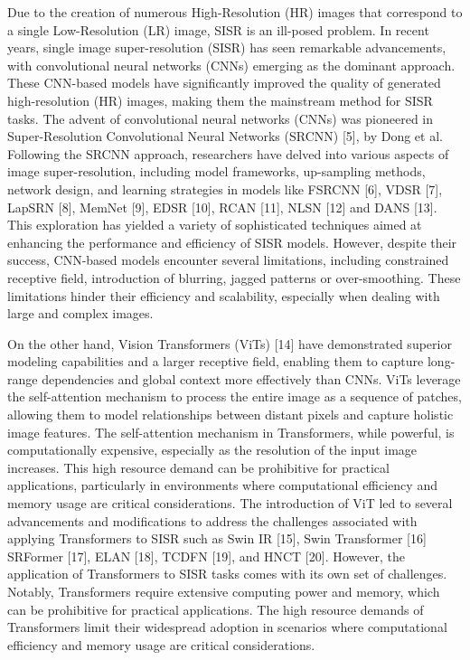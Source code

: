 \documentclass{ieeeaccess}
\begin{document}
Due to the creation of numerous High-Resolution (HR) images that correspond to a single Low-Resolution (LR) image, SISR is an ill-posed problem. In recent years, single image super-resolution (SISR) has seen remarkable advancements, with convolutional neural networks (CNNs) emerging as the dominant approach. These CNN-based models have significantly improved the quality of generated high-resolution (HR) images, making them the mainstream method for SISR tasks. The advent of convolutional neural networks (CNNs) was pioneered in Super-Resolution Convolutional Neural Networks (SRCNN) [5],  by Dong et al. Following the SRCNN approach, researchers have delved into various aspects of image super-resolution, including model frameworks, up-sampling methods, network design, and learning strategies in models like FSRCNN [6], VDSR [7], LapSRN [8], MemNet [9], EDSR [10], RCAN [11], NLSN [12] and DANS [13]. This exploration has yielded a variety of sophisticated techniques aimed at enhancing the performance and efficiency of SISR models. However, despite their success, CNN-based models encounter several limitations, including constrained receptive field, introduction of blurring, jagged patterns or over-smoothing. These limitations hinder their efficiency and scalability, especially when dealing with large and complex images.

On the other hand, Vision Transformers (ViTs) [14] have demonstrated superior modeling capabilities and a larger receptive field, enabling them to capture long-range dependencies and global context more effectively than CNNs. ViTs leverage the self-attention mechanism to process the entire image as a sequence of patches, allowing them to model relationships between distant pixels and capture holistic image features. The self-attention mechanism in Transformers, while powerful, is computationally expensive, especially as the resolution of the input image increases. This high resource demand can be prohibitive for practical applications, particularly in environments where computational efficiency and memory usage are critical considerations. The introduction of ViT led to several advancements and modifications to address the challenges associated with applying Transformers to SISR such as Swin IR [15], Swin Transformer [16] SRFormer [17], ELAN [18], TCDFN [19], and HNCT [20]. However, the application of Transformers to SISR tasks comes with its own set of challenges. Notably, Transformers require extensive computing power and memory, which can be prohibitive for practical applications. The high resource demands of Transformers limit their widespread adoption in scenarios where computational efficiency and memory usage are critical considerations.
\end{document}
